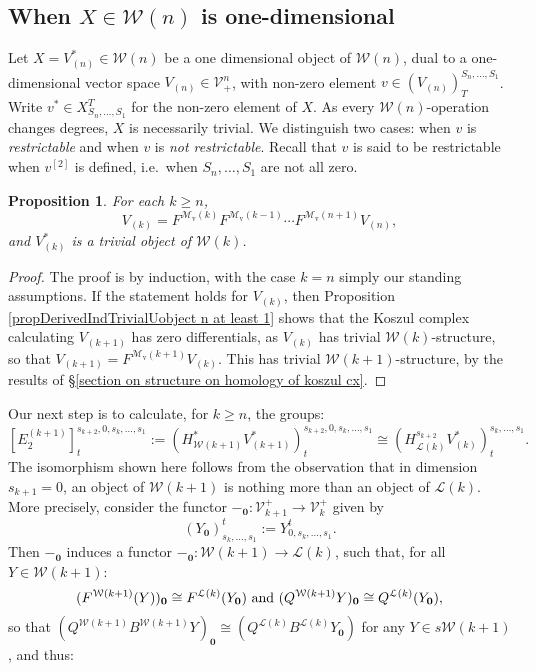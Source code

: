 \documentclass[11pt]{amsart} \renewcommand{\baselinestretch}{1.4}
\theoremstyle{plain}
\newtheorem{prop}[thm]{Proposition}
\theoremstyle{definition}
\newcommand{\DASH}{\mathrm{-}}
\renewcommand{\to}{\longrightarrow}
\newcommand{\calL}{\mathcal{L}}
\newcommand{\calV}{\mathcal{V}}
\newcommand{\calw}{\mathcal{W}}
\newcommand{\calMv}{\mathcal{M}\dver}
\newcommand{\restn}[1]{#1^{[2]}}
\newcommand{\vect}[2]{\calV^{#1}_{#2}}
\newcommand{\E}[5]{[E^{#1}_{#2}#3]^{#4}_{#5}}
\newcommand{\dver}{_\mathrm{v}}
\begin{document}
\begin{Calculations of HWn for n nonzero}
\subsection{When $X\in\calw(n)$ is one-dimensional}
Let $X=V^*_{(n)}\in\calw(n)$ be a one dimensional object of $\calw(n)$, %
dual to a one-dimensional vector space $V_{(n)}\in\vect{n}{+}$, with non-zero element $v\in(V_{(n)})^{S_n,\ldots,S_1}_T$. Write $v^*\in X^T_{S_n,\ldots,S_1}$ for the non-zero element of $X$. As every $\calw(n)$-operation changes degrees, $X$ is necessarily trivial. We distinguish two cases: when $v$ is \emph{restrictable} and when $v$ is \emph{not restrictable}. Recall that $v$ is said to be restrictable when $\restn{v}$ is defined, i.e.\ when $S_n,\ldots,S_1$ are not all zero.
\begin{prop}
\label{iterative calc of the Vk all trivial}
For each $k\geq n$,
\[V_{(k)}=F^{\calMv(k)}F^{\calMv(k-1)}\cdots F^{\calMv(n+1)}V_{(n)},\]
and $V^*_{(k)}$ is a trivial object of $\calw(k)$.
\end{prop}
\begin{proof}
The proof is by induction, with the case $k=n$ simply our standing assumptions. If the statement holds for $V_{(k)}$, then Proposition \ref{propDerivedIndTrivialUobject n at least 1} shows that the Koszul complex calculating $V_{(k+1)}$ has zero differentials, as $V_{(k)}$ has trivial $\calw(k)$-structure, so that $V_{(k+1)}=F^{\calMv(k+1)}V_{(k)}$. This has trivial $\calw(k+1)$-structure, by the results of \S\ref{section on structure on homology of koszul cx}.
\end{proof}
Our next step is to calculate, for $k\geq n$, the groups:
\[\E{(k+1)}{2}{}{s_{k+2},0,s_k,\ldots,s_1}{t}:=(H^*_{\calw(k+1)}V^*_{(k+1)})^{s_{k+2},0,s_k,\ldots,s_1}_{t}\cong (H^{s_{k+2}}_{\calL(k)}V^*_{(k)})^{s_k,\ldots,s_1}_{t}.\]
The isomorphism shown here follows from the observation that in dimension $s_{k+1}=0$, an object of $\calw(k+1)$ is nothing more than an object of $\calL(k)$. More precisely, consider the functor $\DASH_\textbf{0}:\vect{+}{k+1}\to \vect{+}{k}$ given by
\[(Y_\textbf{0})^t_{s_k,\ldots,s_1}:=Y^t_{0,s_k,\ldots,s_1}.\]
Then $\DASH_\textbf{0}$ induces a functor $\DASH_\textbf{0}:\calw(k+1)\to \calL(k)$, such that, for all $Y\in\calw(k+1)$:
\[(F^{\calw(k+1)}(Y))_\textbf{0}\cong F^{\calL(k)}(Y_\textbf{0})\textup{ and }(Q^{\calw(k+1)}Y)_\textbf{0}\cong Q^{\calL(k)}(Y_\textbf{0}),\]
so that $(Q^{\calw(k+1)}B^{\calw(k+1)}Y)_{\textbf{0}} \cong(Q^{\calL(k)}B^{\calL(k)}Y_{\textbf{0}})$ for any $Y\in s\calw(k+1)$, and thus:

\end{Calculations of HWn for n nonzero}
\end{document}
